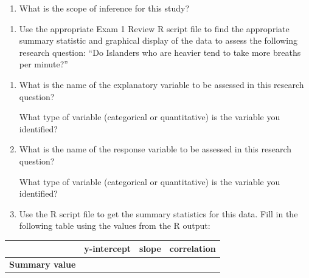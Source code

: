 \documentclass[
]{report}
\providecommand{\tightlist}{%
  \setlength{\itemsep}{0pt}\setlength{\parskip}{0pt}}
\begin{document}
\vspace{0.5in}

\begin{enumerate}
\def\labelenumi{\alph{enumi}.}
\setcounter{enumi}{10}
\tightlist
\item
  What is the scope of inference for this study?
\end{enumerate}

\newpage

\begin{enumerate}
\def\labelenumi{\arabic{enumi}.}
\setcounter{enumi}{5}
\tightlist
\item
  Use the appropriate Exam 1 Review R script file to find the appropriate summary statistic and graphical display of the data to assess the following research question: ``Do Islanders who are heavier tend to take more breaths per minute?''
\end{enumerate}

\begin{enumerate}
\def\labelenumi{\alph{enumi}.}
\item
  What is the name of the explanatory variable to be assessed in this research question?
  \vspace{0.3in}

  What type of variable (categorical or quantitative) is the variable you identified?
  \vspace{0.3in}
\item
  What is the name of the response variable to be assessed in this research question?
  \vspace{0.3in}

  What type of variable (categorical or quantitative) is the variable you identified?
  \vspace{0.3in}
\item
  Use the R script file to get the summary statistics for this data. Fill in the following table using the values from the R output:
\end{enumerate}

\begingroup
\setlength{\tabcolsep}{14pt}
\renewcommand{\arraystretch}{2}
\begin{center}
\begin{tabular}{|c|p{1in}|p{1in}|p{1in}|}
\hline
 & y-intercept & slope & correlation \\ \hline
 \textbf{Summary value} & & & \\ \hline
\end{tabular}
\end{center}
\endgroup
\end{document}
